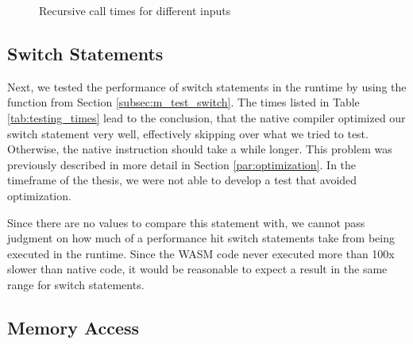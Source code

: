 \begin{figure}[h]
    \centering
    \caption{Recursive call times for different inputs}
    \label{fig:times_recursive}
\end{figure}

\subsection{Switch Statements}

Next, we tested the performance of switch statements in the runtime by using the function from Section \ref{subsec:m_test_switch}. The times listed in Table \ref{tab:testing_times} lead to the conclusion, that the native compiler optimized our switch statement very well, effectively skipping over what we tried to test. Otherwise, the native instruction should take a while longer. This problem was previously described in more detail in Section \ref{par:optimization}. In the timeframe of the thesis, we were not able to develop a test that avoided optimization.

Since there are no values to compare this statement with, we cannot pass judgment on how much of a performance hit switch statements take from being executed in the runtime. Since the WASM code never executed more than 100x slower than native code, it would be reasonable to expect a result in the same range for switch statements.

\subsection{Memory Access}

